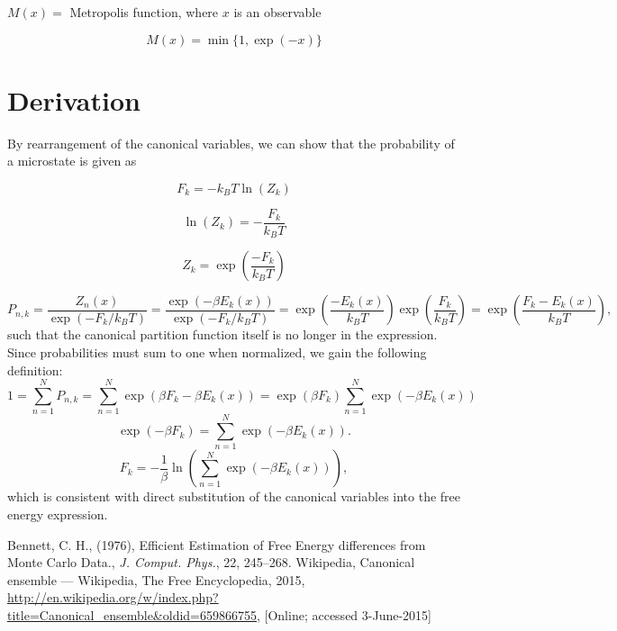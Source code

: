 \documentclass[]{article}
\begin{document}
$M(x) =$ Metropolis function, where $x$ is an observable

\[ M(x) = \min \{ 1, \exp(-x) \} \]

\section*{Derivation}

By rearrangement of the canonical variables, we can show that the probability of a microstate\cite{wikiCPF} is given as
\begin{minipage}[b]{0.32\linewidth}
	\[ F_k = -k_B T \ln(Z_k) \]
\end{minipage}
\hfill
\begin{minipage}[b]{0.32\linewidth}
	\[ \ln(Z_k) = -\frac{F_k}{k_B T}  \]
\end{minipage}
\hfill
\begin{minipage}[b]{0.32\linewidth}
	\[ Z_k = \exp \left( \frac{-F_k}{k_B T} \right) \]
\end{minipage}
\[ P_{n,k} = \frac{Z_n(x)}{\exp (-F_k/k_B T)} = \frac{\exp(-\beta E_k(x))}{\exp (-F_k/k_B T)} = \exp\left(\frac{-E_k(x)}{k_B T}\right) \exp \left( \frac{F_k}{k_B T} \right) = \exp\left(\frac{F_k-E_k(x)}{k_B T} \right), \]
such that the canonical partition function itself is no longer in the expression. Since probabilities must sum to one when normalized, we gain the following definition:
\[ 1 = \sum_{n=1}^{N} P_{n,k} = \sum_{n=1}^{N} \exp(\beta F_k - \beta E_k(x)) = \exp(\beta F_k) \sum_{n=1}^{N} \exp(- \beta E_k(x)) \]
\[ \exp(-\beta F_k) = \sum_{n=1}^{N} \exp(- \beta E_k(x)). \]
\[ F_k = -\frac{1}{\beta} \ln \left( \sum_{n=1}^{N} \exp(- \beta E_k(x)) \right), \]
which is consistent with direct substitution of the canonical variables into the free energy expression.

\begin{thebibliography}{9}
		Bennett, C. H.,
		(1976),
		Efficient Estimation of Free Energy differences from Monte Carlo Data.,
		\emph{J. Comput. Phys.},
		22, 
		245–268.
		Wikipedia,
		Canonical ensemble --- Wikipedia{,} The Free Encyclopedia,
		2015,
		\url{http://en.wikipedia.org/w/index.php?title=Canonical_ensemble&oldid=659866755},
		[Online; accessed 3-June-2015]
\end{thebibliography}
\end{document}
